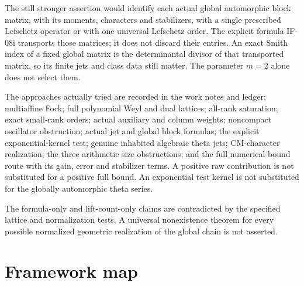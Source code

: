 \documentclass[11pt,a4paper]{article}
\theoremstyle{definition}
\theoremstyle{remark}
\begin{document}
The still stronger assertion would identify each actual global
automorphic block matrix, with its moments, characters and
stabilizers, with a single prescribed Lefschetz operator or with
one universal Lefschetz order. The explicit formula IF-08i
transports those matrices; it does not discard their entries.
An exact Smith index of a fixed global matrix is the determinantal
divisor of that transported matrix, so its finite jets and class
data still matter. The parameter $m=2$ alone does not select them.

The approaches actually tried are recorded in the work notes and
ledger: multiaffine Fock; full polynomial Weyl and dual lattices;
all-rank saturation; exact small-rank orders; actual auxiliary and
column weights; noncompact oscillator obstruction; actual jet and
global block formulas; the explicit exponential-kernel test; genuine
inhabited algebraic theta jets; CM-character realization; the three
arithmetic size obstructions; and
the full numerical-bound route with its gain, error and stabilizer
terms. A positive raw contribution is not substituted for a
positive full bound. An exponential test kernel is not substituted
for the globally automorphic theta series.

The formula-only and lift-count-only claims are contradicted by
the specified lattice and normalization tests. A universal
nonexistence theorem for every possible normalized geometric
realization of the global chain is not asserted.

\section{Framework map}
\end{document}
